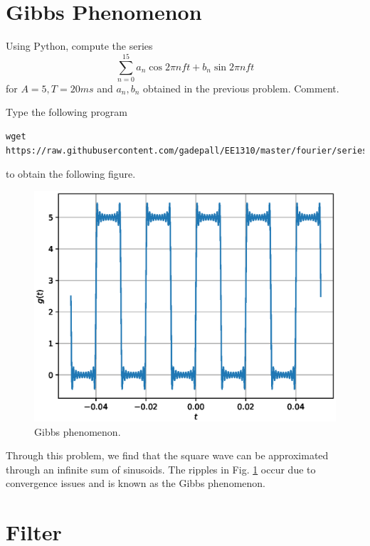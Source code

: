 \documentclass[journal,12pt,twocolumn]{IEEEtran}
\begin{document}
\section{Gibbs Phenomenon}
%
\begin{problem}
Using Python, compute the series 
%
\begin{equation}
\sum_{n=0}^{15}a_n\cos 2\pi n f t + b_n \sin 2 \pi n f t
\end{equation}
%
for $A=5, T= 20 ms$ and $a_n,b_n$ obtained in the previous problem.  Comment.
%
\label{fourier_series}
\end{problem}
\solution  Type the following program
%
\begin{lstlisting}
wget https://raw.githubusercontent.com/gadepall/EE1310/master/fourier/series/codes/1.4.py
\end{lstlisting}
%
to obtain the following figure.
\begin{figure}[!h]
\centering

\includegraphics[width=\columnwidth]{./figs/1.4.eps}
\caption{Gibbs phenomenon.}
\label{fig:1.4}
\end{figure}
%
Through this problem, we find that the square wave can be approximated through an infinite sum of sinusoids. The ripples in Fig. \ref{fig:1.4} occur due to convergence issues and is known as the Gibbs phenomenon.
%
%
\section{Filter}
%
\end{document}
